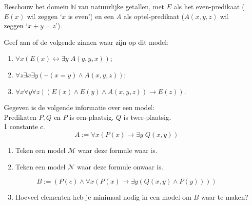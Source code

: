 \begin{exercise}
Beschouw het domein $\mathbb{N}$ van natuurlijke getallen, met $E$ als het even-predikaat ($E(x)$ wil zeggen `$x$ is even') en een $A$ als optel-predikaat ($A(x,y,z)$ wil zeggen `$x+y=z$').

Geef aan of de volgende zinnen waar zijn op dit model:
\begin{enumerate}[label=\textit{\alph*.}]
\item $\forall x(E(x)\leftrightarrow\exists y\;A(y,y,x))$;
\item $\forall z\exists x\exists y(\neg(x=y)\wedge A(x,y,z))$;
\item $\forall x\forall y\forall z((E(x)\wedge E(y)\wedge A(x, y, z))\rightarrow E(z))$.
\end{enumerate}
\end{exercise}

\begin{exercise}
Gegeven is de volgende informatie over een model:\\
Predikaten $P,Q$ en $P$ is een-plaatsig, $Q$ is twee-plaatsig.\\
1 constante $c$.
$$A:= \forall x (P(x)\rightarrow\exists y\; Q(x,y))$$
\begin{enumerate}[label=\textit{\alph*.}]
\item Teken een model $\mathcal M$ waar deze formule waar is.
\item Teken een model $\mathcal N$ waar deze formule onwaar is.
\end{enumerate}
$$B:=(P(c)\wedge\forall x(P(x)\rightarrow\exists y(Q(x,y)\wedge P(y))))$$
\begin{enumerate}[label=\textit{\alph*.}]
\setcounter{enumi}{2}
\item Hoeveel elementen heb je minimaal nodig in een model om $B$ waar te maken?
\end{enumerate}
\end{exercise}

